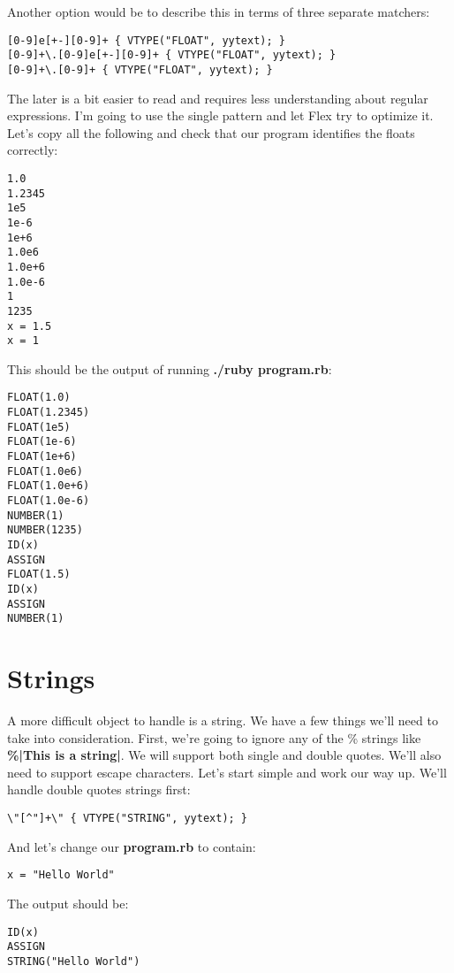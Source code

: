 {Another option would be to describe this in terms of three separate matchers:

\begin{lstlisting}
[0-9]e[+-][0-9]+ { VTYPE("FLOAT", yytext); }
[0-9]+\.[0-9]e[+-][0-9]+ { VTYPE("FLOAT", yytext); }
[0-9]+\.[0-9]+ { VTYPE("FLOAT", yytext); }
\end{lstlisting}

The later is a bit easier to read and requires less understanding about regular expressions. I'm going to use the single pattern and let Flex try to optimize it. Let's copy all the following and check that our program identifies the floats correctly:

\begin{lstlisting}
1.0
1.2345
1e5
1e-6
1e+6
1.0e6
1.0e+6
1.0e-6
1
1235
x = 1.5
x = 1
\end{lstlisting}

This should be the output of running {\bf ./ruby program.rb}:

\begin{lstlisting}
FLOAT(1.0)
FLOAT(1.2345)
FLOAT(1e5)
FLOAT(1e-6)
FLOAT(1e+6)
FLOAT(1.0e6)
FLOAT(1.0e+6)
FLOAT(1.0e-6)
NUMBER(1)
NUMBER(1235)
ID(x)
ASSIGN
FLOAT(1.5)
ID(x)
ASSIGN
NUMBER(1)
\end{lstlisting}

\section{Strings}

A more difficult object to handle is a string. We have a few things we'll need to take into consideration. First, we're going to ignore any of the \% strings like {\bf \%|This is a string|}. We will support both single and double quotes. We'll also need to support escape characters. Let's start simple and work our way up. We'll handle double quotes strings first:

\begin{lstlisting}
\"[^"]+\" { VTYPE("STRING", yytext); }
\end{lstlisting}

And let's change our {\bf program.rb} to contain:

\begin{lstlisting}
x = "Hello World"
\end{lstlisting}

The output should be:

\begin{lstlisting}
ID(x)
ASSIGN
STRING("Hello World")
\end{lstlisting}

}
